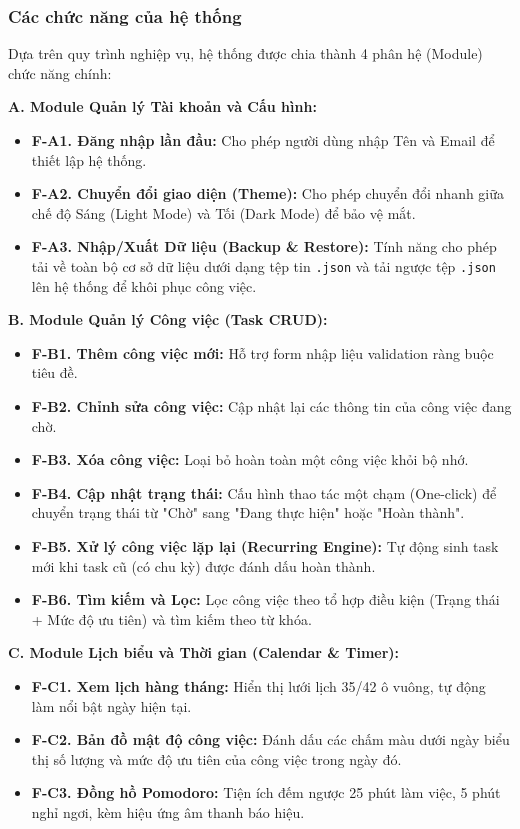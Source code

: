 \subsubsection{Các chức năng của hệ thống}
Dựa trên quy trình nghiệp vụ, hệ thống được chia thành 4 phân hệ (Module) chức năng chính:

\textbf{A. Module Quản lý Tài khoản và Cấu hình:}
\begin{itemize}
    \item \textbf{F-A1. Đăng nhập lần đầu:} Cho phép người dùng nhập Tên và Email để thiết lập hệ thống.
    \item \textbf{F-A2. Chuyển đổi giao diện (Theme):} Cho phép chuyển đổi nhanh giữa chế độ Sáng (Light Mode) và Tối (Dark Mode) để bảo vệ mắt.
    \item \textbf{F-A3. Nhập/Xuất Dữ liệu (Backup \& Restore):} Tính năng cho phép tải về toàn bộ cơ sở dữ liệu dưới dạng tệp tin \texttt{.json} và tải ngược tệp \texttt{.json} lên hệ thống để khôi phục công việc.
\end{itemize}

\textbf{B. Module Quản lý Công việc (Task CRUD):}
\begin{itemize}
    \item \textbf{F-B1. Thêm công việc mới:} Hỗ trợ form nhập liệu validation ràng buộc tiêu đề.
    \item \textbf{F-B2. Chỉnh sửa công việc:} Cập nhật lại các thông tin của công việc đang chờ.
    \item \textbf{F-B3. Xóa công việc:} Loại bỏ hoàn toàn một công việc khỏi bộ nhớ.
    \item \textbf{F-B4. Cập nhật trạng thái:} Cấu hình thao tác một chạm (One-click) để chuyển trạng thái từ "Chờ" sang "Đang thực hiện" hoặc "Hoàn thành".
    \item \textbf{F-B5. Xử lý công việc lặp lại (Recurring Engine):} Tự động sinh task mới khi task cũ (có chu kỳ) được đánh dấu hoàn thành.
    \item \textbf{F-B6. Tìm kiếm và Lọc:} Lọc công việc theo tổ hợp điều kiện (Trạng thái + Mức độ ưu tiên) và tìm kiếm theo từ khóa.
\end{itemize}

\textbf{C. Module Lịch biểu và Thời gian (Calendar \& Timer):}
\begin{itemize}
    \item \textbf{F-C1. Xem lịch hàng tháng:} Hiển thị lưới lịch 35/42 ô vuông, tự động làm nổi bật ngày hiện tại.
    \item \textbf{F-C2. Bản đồ mật độ công việc:} Đánh dấu các chấm màu dưới ngày biểu thị số lượng và mức độ ưu tiên của công việc trong ngày đó.
    \item \textbf{F-C3. Đồng hồ Pomodoro:} Tiện ích đếm ngược 25 phút làm việc, 5 phút nghỉ ngơi, kèm hiệu ứng âm thanh báo hiệu.
\end{itemize}

